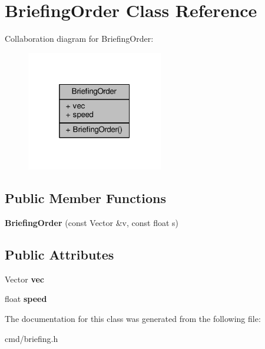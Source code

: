 \hypertarget{classBriefingOrder}{}\section{Briefing\+Order Class Reference}
\label{classBriefingOrder}


Collaboration diagram for Briefing\+Order\+:
\nopagebreak
\begin{figure}[H]
\begin{center}
\leavevmode
\includegraphics[width=169pt]{d6/d93/classBriefingOrder__coll__graph}
\end{center}
\end{figure}
\subsection*{Public Member Functions}
\begin{DoxyCompactItemize}
\item 
{\bfseries Briefing\+Order} (const Vector \&v, const float s)\hypertarget{classBriefingOrder_a0faba1df995dc997c786659c1a0f3e99}{}\label{classBriefingOrder_a0faba1df995dc997c786659c1a0f3e99}

\end{DoxyCompactItemize}
\subsection*{Public Attributes}
\begin{DoxyCompactItemize}
\item 
Vector {\bfseries vec}\hypertarget{classBriefingOrder_ae266f73f8ecab6a25bdf31b0fcd862e2}{}\label{classBriefingOrder_ae266f73f8ecab6a25bdf31b0fcd862e2}

\item 
float {\bfseries speed}\hypertarget{classBriefingOrder_ae3f3c7c45d7fd989d169a39023f57513}{}\label{classBriefingOrder_ae3f3c7c45d7fd989d169a39023f57513}

\end{DoxyCompactItemize}


The documentation for this class was generated from the following file\+:\begin{DoxyCompactItemize}
\item 
cmd/briefing.\+h\end{DoxyCompactItemize}
